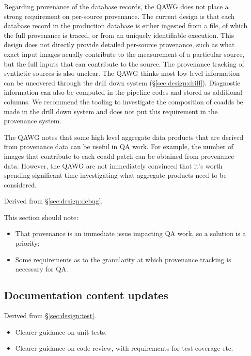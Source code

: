 Regarding provenance of the database records, the QAWG does not
place a strong requirement on per-source provenance.  The current
design is that each database record in the production database is
either ingested from a file, of which the full provenance is traced,
or from an uniquely identifiable execution.  This design does not
directly provide detailed per-source provenance, such as what exact
input images acually contribute to the measurement of a particular
source, but the full inputs that can contribute to the source.  The
provenance tracking of synthetic sources is also unclear.  The QAWG
thinks most low-level information can be uncovered through the drill
down system (\S\ref{sec:design:drill}).  Diagnostic information can
also be computed in the pipeline codes and stored as additional
columns.  We recommend the tooling to investigate the composition
of coadds be made in the drill down system and does not put this
requirement in the provenance system.

The QAWG notes that some high level aggregate data products that
are derived from provenance data can be useful in QA work.  For
example, the number of images that contribute to each coadd patch
can be obtained from provenance data.  However, the QAWG are not
immediately convinced that it's worth spending significant time
investigating what aggregate products need to be considered.

Derived from \S\ref{sec:design:debug}.

This section should note:

\begin{itemize}

  \item{That provenance is an immediate issue impacting QA work, so a solution
  is a priority;}

  \item{Some requirements as to the granularity at which provenance tracking
  is necessary for QA.}

\end{itemize}

\subsection{Documentation content updates}
\label{sec:comp:doc}

Derived from \S\ref{sec:design:test}.


\begin{itemize}

  \item{Clearer guidance on unit tests.}
  \item{Clearer guidance on code review, with requirements for test coverage
  etc.}

\end{itemize}

